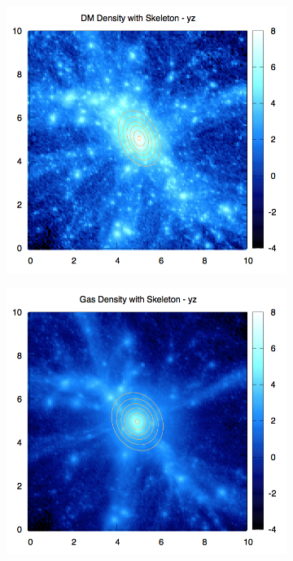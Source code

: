 \documentclass[journal]{IEEEtran}
\begin{document}
\begin{figure}[!t]
\begin{subfigure}[t]{0.3\textwidth}
	\end{subfigure}
	\\
	\begin{subfigure}[t]{0.3\textwidth}
		\centering
		\includegraphics[width=\linewidth]{DMDenEllipyz.png}
	\end{subfigure}
	\quad
	\begin{subfigure}[t]{0.3\textwidth}
		\centering
		\includegraphics[width=\linewidth]{GasDenEllipyz.png}

\end{subfigure}
\end{figure}
\end{document}
